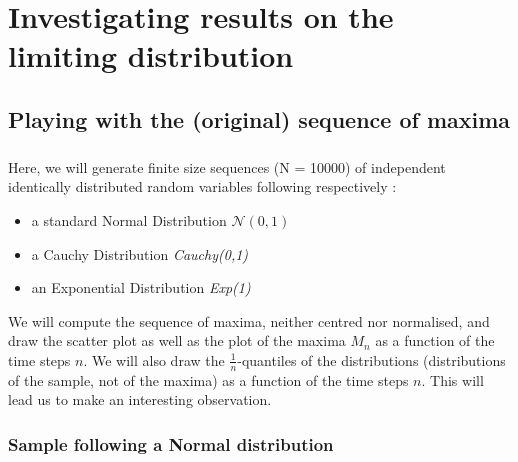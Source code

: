 \chapter{Investigating results on the limiting distribution}
\section{Playing with the (original) sequence of maxima}
\paragraph{}
Here, we will generate finite size sequences (N = 10000) of independent identically distributed random variables following respectively :
\begin{itemize}
	\item a standard Normal Distribution $\mathcal{N}(0,1)$
	\item a Cauchy Distribution \textit{Cauchy(0,1)}
	\item an Exponential Distribution \textit{Exp(1)}
\end{itemize}
We will compute the sequence of maxima, neither centred nor normalised, and draw the scatter plot as well as the plot of the maxima  $M_n$ as a function of the time steps $n$.
We will also draw the $\frac{1}{n}$-quantiles of the distributions (distributions of the sample, not of the maxima) as a function of the time steps $n$. This will lead us to make an interesting observation.
\subsection{Sample following a Normal distribution}
